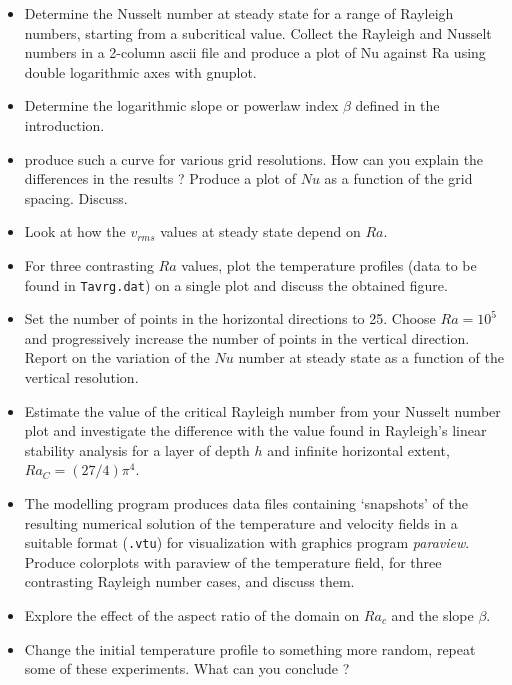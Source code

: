 \begin{itemize}
\item Determine the Nusselt number at steady state for a range of Rayleigh numbers, 
starting from a subcritical value. 
Collect the Rayleigh and Nusselt numbers in a 2-column ascii file and produce a plot of Nu against Ra using double logarithmic axes with
gnuplot.
\item Determine the logarithmic slope or powerlaw index $\beta$ defined in the introduction.

\item produce such a curve for various grid resolutions. How can you explain the differences in the results ? Produce a plot 
of $Nu$ as a function of the grid spacing. Discuss.

\item Look at how the $v_{rms}$ values at steady state depend on $Ra$. 

\item For three contrasting $Ra$ values, plot the temperature profiles (data to be found in {\tt Tavrg.dat}) on a single plot and discuss the obtained figure.

\item Set the number of points in the horizontal directions to 25. Choose $Ra=10^5$ and progressively increase the number 
of points in the vertical direction. Report on the variation of the $Nu$ number at steady state as a function of the vertical
resolution.

\item Estimate the value of the critical Rayleigh number from your Nusselt number plot and investigate the 
difference with the value found in Rayleigh's linear stability analysis for a layer of depth $h$ and infinite horizontal extent, 
$Ra_C = (27/4)  \pi^4$.

\item The modelling program produces data files containing ‘snapshots’ of the resulting numerical solution 
of the temperature and velocity fields in a suitable format ({\tt .vtu}) for visualization with graphics program {\sl paraview}. 
Produce colorplots with paraview of the temperature field, for three contrasting Rayleigh number cases, and discuss them.

\item Explore the effect of the aspect ratio of the domain on $Ra_c$ and the slope $\beta$.

\item Change the initial temperature profile to something more random, repeat some of these experiments. What can you conclude ?

\end{itemize}


